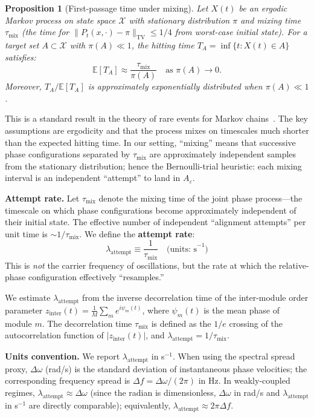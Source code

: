 \documentclass[12pt]{article}
\newtheorem{proposition}{Proposition}
\begin{document}
\begin{proposition}[First-passage time under mixing]\label{prop:fpt}
Let $X(t)$ be an ergodic Markov process on state space $\mathcal{X}$ with stationary distribution $\pi$ and mixing time $\tau_{\mathrm{mix}}$ (the time for $\|P_t(x, \cdot) - \pi\|_{\mathrm{TV}} \leq 1/4$ from worst-case initial state). For a target set $A \subset \mathcal{X}$ with $\pi(A) \ll 1$, the hitting time $T_A = \inf\{t : X(t) \in A\}$ satisfies:
\[
\mathbb{E}[T_A] \approx \frac{\tau_{\mathrm{mix}}}{\pi(A)} \quad \text{as } \pi(A) \to 0.
\]
Moreover, $T_A / \mathbb{E}[T_A]$ is approximately exponentially distributed when $\pi(A) \ll 1$.
\end{proposition}
\noindent This is a standard result in the theory of rare events for Markov chains~\cite{kac1947,levinperes2017}. The key assumptions are ergodicity and that the process mixes on timescales much shorter than the expected hitting time. In our setting, ``mixing'' means that successive phase configurations separated by $\tau_{\mathrm{mix}}$ are approximately independent samples from the stationary distribution; hence the Bernoulli-trial heuristic: each mixing interval is an independent ``attempt'' to land in $A_\varepsilon$.

\textbf{Attempt rate.} Let $\tau_{\mathrm{mix}}$ denote the mixing time of the joint phase process---the timescale on which phase configurations become approximately independent of their initial state. The effective number of independent ``alignment attempts'' per unit time is $\sim 1/\tau_{\mathrm{mix}}$. We define the \textbf{attempt rate}:
\[
\lambda_{\mathrm{attempt}} \equiv \frac{1}{\tau_{\mathrm{mix}}} \quad \text{(units: s}^{-1}\text{)}
\]
This is \emph{not} the carrier frequency of oscillations, but the rate at which the relative-phase configuration effectively ``resamples.''

We estimate $\lambda_{\mathrm{attempt}}$ from the inverse decorrelation time of the inter-module order parameter $z_{\mathrm{inter}}(t) = \frac{1}{M}\sum_m e^{i\psi_m(t)}$, where $\psi_m(t)$ is the mean phase of module $m$. The decorrelation time $\tau_{\mathrm{mix}}$ is defined as the $1/e$ crossing of the autocorrelation function of $|z_{\mathrm{inter}}(t)|$, and $\lambda_{\mathrm{attempt}} = 1/\tau_{\mathrm{mix}}$.

\textbf{Units convention.} We report $\lambda_{\mathrm{attempt}}$ in s$^{-1}$. When using the spectral spread proxy, $\Delta\omega$ (rad/s) is the standard deviation of instantaneous phase velocities; the corresponding frequency spread is $\Delta f = \Delta\omega/(2\pi)$ in Hz. In weakly-coupled regimes, $\lambda_{\mathrm{attempt}} \approx \Delta\omega$ (since the radian is dimensionless, $\Delta\omega$ in rad/s and $\lambda_{\mathrm{attempt}}$ in s$^{-1}$ are directly comparable); equivalently, $\lambda_{\mathrm{attempt}} \approx 2\pi\Delta f$.
\end{document}
